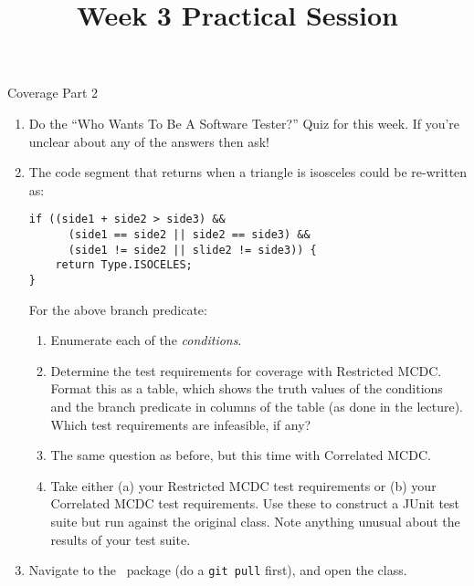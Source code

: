 



\title{Week 3 Practical Session}{Coverage Part 2}

\begin{enumerate}

    \item Do the ``Who Wants To Be A Software Tester?'' Quiz for this week.
    If you're unclear about any of the answers then ask!

    \item The code segment that returns when a triangle is isosceles could be re-written as:

        \verb$if ((side1 + side2 > side3) &&$\\ 
        \verb$      (side1 == side2 || side2 == side3) &&$\\
        \verb$      (side1 != side2 || slide2 != side3)) {$\\
        \verb$    return Type.ISOCELES;$\\
        \verb$}$

        For the above branch predicate:

        \begin{enumerate}

            \item Enumerate each of the {\it conditions}.
            
            \item Determine the test requirements for coverage with Restricted
            MCDC. Format this as a table, which shows the truth values of the
            conditions and the branch predicate in columns of the table (as done
            in the lecture). Which test requirements are infeasible, if any?

            \item The same question as before, but this time with Correlated MCDC. 
            
            \item Take either (a) your Restricted MCDC test requirements or (b) your
            Correlated MCDC test requirements. Use these to construct a JUnit test
            suite but run against the original \triangleclass class. Note anything
            unusual about the results of your test suite.
            
        \end{enumerate}

    \item Navigate to the \practicalspackage~package (do a {\tt git pull} first), and open the
        \spacedefenderclass class. 
    

\end{enumerate}

